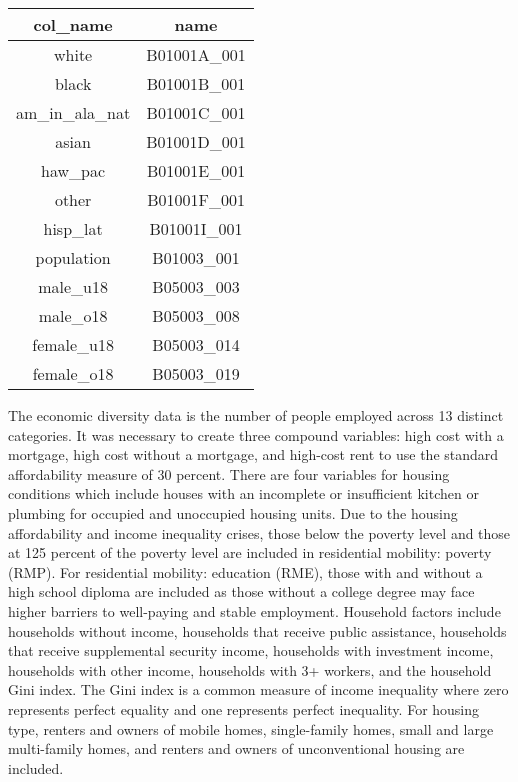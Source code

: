 \begin{table}[ht]
\small
\centering
\begin{tabular}{|c|c|}
  \hline
col\_name & name \\ 
  \hline
white & B01001A\_001 \\ 
  \hline
  black & B01001B\_001 \\ 
    \hline
  am\_in\_ala\_nat & B01001C\_001 \\ 
    \hline
  asian & B01001D\_001 \\ 
    \hline
  haw\_pac & B01001E\_001 \\ 
    \hline
  other & B01001F\_001 \\ 
    \hline
  hisp\_lat & B01001I\_001 \\ 
    \hline
  population & B01003\_001 \\ 
    \hline
  male\_u18 & B05003\_003 \\ 
    \hline
  male\_o18 & B05003\_008 \\ 
    \hline
  female\_u18 & B05003\_014 \\ 
    \hline
  female\_o18 & B05003\_019 \\ 
   \hline
\end{tabular}
\end{table}

The economic diversity data is the number of people employed across 13 distinct categories. It was necessary to create three compound variables: high cost with a mortgage, high cost without a mortgage, and high-cost rent to use the standard affordability measure of 30 percent. There are four variables for housing conditions which include houses with an incomplete or insufficient kitchen or plumbing for occupied and unoccupied housing units.  Due to the housing affordability and income inequality crises, those below the poverty level and those at 125 percent of the poverty level are included in residential mobility: poverty (RMP). For residential mobility: education (RME), those with and without a high school diploma are included as those without a college degree may face higher barriers to well-paying and stable employment. Household factors include households without income, households that receive public assistance, households that receive supplemental security income, households with investment income, households with other income, households with 3+ workers, and the household Gini index. The Gini index is a common measure of income inequality where zero represents perfect equality and one represents perfect inequality. For housing type, renters and owners of mobile homes, single-family homes, small and large multi-family homes, and renters and owners of unconventional housing are included.  



